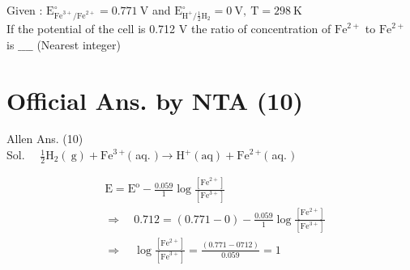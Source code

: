 \documentclass[10pt]{article}
\begin{document}
Given : \(\mathrm{E}_{\mathrm{Fe}^{3+} / \mathrm{Fe}^{2+}}^{\circ}=0.771 \mathrm{~V}\) and \(\mathrm{E}_{\mathrm{H}^{+} / \frac{1}{2} \mathrm{H}_{2}}^{\circ}=0 \mathrm{~V}, \mathrm{~T}=298 \mathrm{~K}\)\\
If the potential of the cell is 0.712 V the ratio of concentration of \(\mathrm{Fe}^{2+}\) to \(\mathrm{Fe}^{2+}\) is \(\_\_\_\_\) (Nearest integer)

\section*{Official Ans. by NTA (10)}
Allen Ans. (10)\\
Sol. \(\quad \frac{1}{2} \mathrm{H}_{2}(\mathrm{~g})+\mathrm{Fe}^{3+}(\) aq. \() \longrightarrow \mathrm{H}^{+}(\mathrm{aq})+\mathrm{Fe}^{2+}(\) aq. \()\)

\[
\begin{aligned}
& \mathrm{E}=\mathrm{E}^{\mathrm{o}}-\frac{0.059}{1} \log \frac{\left[\mathrm{Fe}^{2+}\right]}{\left[\mathrm{Fe}^{3+}\right]} \\
& \Rightarrow \quad 0.712=(0.771-0)-\frac{0.059}{1} \log \frac{\left[\mathrm{Fe}^{2+}\right]}{\left[\mathrm{Fe}^{3+}\right]} \\
& \Rightarrow \quad \log \frac{\left[\mathrm{Fe}^{2+}\right]}{\left[\mathrm{Fe}^{3+}\right]}=\frac{(0.771-0712)}{0.059}=1
\end{aligned}
\]
\end{document}
